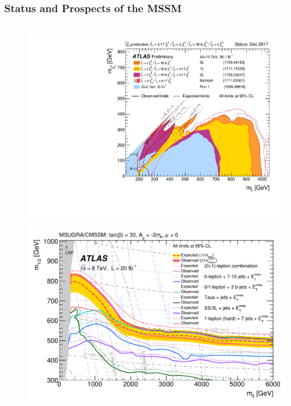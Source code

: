 \documentclass[10pt,aspectratio=169]{beamer}
\begin{document}
\begin{frame}
  \frametitle{Status and Prospects of the MSSM}
  \begin{columns}[t]
    \begin{column}{0.3\textwidth}
      \vspace{-20pt}
      \begin{figure}
        \centering
        \includegraphics[width=\textwidth]{ATLAS_SUSY_Stop_tLSP}
      \end{figure}
      \vspace{-25pt}
      \begin{figure}
        \centering
        \includegraphics[width=\textwidth]{ATLAS_SUSY_MSUGRA}
      \end{figure}

\end{column}
\end{columns}
\end{frame}
\end{document}
